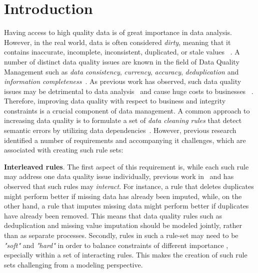 \section{Introduction}
\label{sec:intro}

Having access to high quality data is of great importance in data analysis. However, in the real world, data is often considered \textit{dirty}, meaning that it contains inaccurate, incomplete, inconsistent, duplicated, or stale values ~\cite{chu2004blissful}. A number of distinct data quality issues are known in the field of Data Quality Management such as \textit{data consistency}, \textit{currency}, \textit{accuracy}, \textit{deduplication} and \textit{information completeness}~\cite{fan2012foundations}. As previous work has observed, such data quality issues may be detrimental to data analysis~\cite{national2013Frontiers,Fan:2008:CFD:1366102.1366103} and cause huge costs to businesses ~\cite{waynew.eckerson2002}. Therefore, improving data quality with respect to business and integrity constraints is a crucial component of data management. 
A common approach to increasing data quality is to formulate a set of \textit{data cleaning rules} that detect semantic errors by utilizing data dependencies~\cite{fan2012foundations, Arasu:2009:LDC:1546683.1547340, Dallachiesa:2013:NCD:2463676.2465327, llunaticVDLB2013b}. However, previous research identified a number of requirements and accompanying it challenges, which are associated with creating such rule sets: 

\textbf{Interleaved rules}. The first aspect of this requirement is, while each such rule may address one data quality issue individually, previous work in~\cite{fan2012foundations} and \cite{Fan:2014:IRM:2628135.2567657} has observed that such rules may \textit{interact}. For instance, a rule that deletes duplicates might perform better if missing data has already been imputed, while, on the other hand, a rule that imputes missing data might perform better if duplicates have already been removed. This means that data quality rules such as deduplication and missing value imputation should be modeled jointly, rather than as separate processes.
Secondly, rules in such a rule-set may need to be \textit{"soft"} and \textit{"hard"} in order to balance constraints of different importance \cite{Yakout:2013:DSU:2463676.2463706}, especially within a set of interacting rules. This makes the creation of such rule sets challenging from a modeling perspective. 


